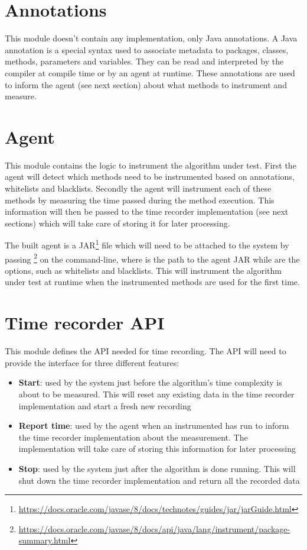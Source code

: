 \section{Annotations}
\label{sec:design:annotations}
This module doesn't contain any implementation, only Java annotations. A Java annotation is a special syntax used to associate metadata to packages, classes, methods, parameters and variables. They can be read and interpreted by the compiler at compile time or by an agent at runtime. These annotations are used to inform the agent (see next section) about what methods to instrument and measure.

\section{Agent}
\label{sec:design:agent}
This module contains the logic to instrument the algorithm under test. First the agent will detect which methods need to be instrumented based on annotations, whitelists and blacklists. Secondly the agent will instrument each of these methods by measuring the time passed during the method execution. This information will then be passed to the time recorder implementation (see next sections) which will take care of storing it for later processing.

\noindent The built agent is a JAR\footnote{\url{https://docs.oracle.com/javase/8/docs/technotes/guides/jar/jarGuide.html}} file which will need to be attached to the system by passing \footnote{\url{https://docs.oracle.com/javase/8/docs/api/java/lang/instrument/package-summary.html}} on the command-line, where  is the path to the agent JAR while  are the options, such as whitelists and blacklists. This will instrument the algorithm under test at runtime when the instrumented methods are used for the first time.


\section{Time recorder API}
This module defines the API needed for time recording. The API will need to provide the interface for three different features:
\begin{itemize}
  \item \textbf{Start}: used by the system just before the algorithm's time complexity is about to be measured. This will reset any existing data in the time recorder implementation and start a fresh new recording
  \item \textbf{Report time}: used by the agent when an instrumented has run to inform the time recorder implementation about the measurement. The implementation will take care of storing this information for later processing
  \item \textbf{Stop}: used by the system just after the algorithm is done running. This will shut down the time recorder implementation and return all the recorded data
\end{itemize}

